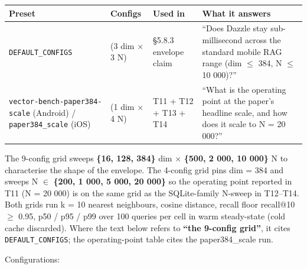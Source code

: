 {\def\LTcaptype{none} %
\begin{longtable}[]{@{}
  >{\raggedright\arraybackslash}p{}
  >{\raggedleft\arraybackslash}p{}
  >{\raggedright\arraybackslash}p{}
  >{\raggedright\arraybackslash}p{}@{}}
\toprule\noalign{}
\begin{minipage}[b]{\linewidth}\raggedright
Preset
\end{minipage} & \begin{minipage}[b]{\linewidth}\raggedleft
Configs
\end{minipage} & \begin{minipage}[b]{\linewidth}\raggedright
Used in
\end{minipage} & \begin{minipage}[b]{\linewidth}\raggedright
What it answers
\end{minipage} \\
\midrule\noalign{}
\endhead
\bottomrule\noalign{}
\endlastfoot
\texttt{DEFAULT\_CONFIGS} & 9 (3 dim \(\times\) 3 N) & §5.8.3 envelope claim &
``Does Dazzle stay sub-millisecond across the standard mobile RAG range (dim
\(\leq\) 384, N \(\leq\) 10 000)?'' \\
\texttt{vector-bench-paper384-scale} (Android) / \texttt{paper384\_scale} (iOS)
& 4 (1 dim \(\times\) 4 N) & T11 + T12 + T13 + T14 & ``What is the operating
point at the paper's headline scale, and how does it scale to N = 20 000?'' \\
\end{longtable}
}

The 9-config grid sweeps \textbf{\{16, 128, 384\}} dim \(\times\) \textbf{\{500,
2 000, 10 000\}} N to characterise the shape of the envelope. The 4-config grid
pins dim = 384 and sweeps N \(\in\) \textbf{\{200, 1 000, 5 000, 20 000\}} so
the operating point reported in T11 (N = 20 000) is on the same grid as the
SQLite-family N-sweep in T12--T14. Both grids run k = 10 nearest neighbours,
cosine distance, recall floor recall@10 \(\geq\) 0.95, p50 / p95 / p99 over 100
queries per cell in warm steady-state (cold cache discarded). Where the text
below refers to \textbf{``the 9-config grid''}, it cites
\texttt{DEFAULT\_CONFIGS}; the operating-point table cites the paper384\_scale
run.

Configurations:

